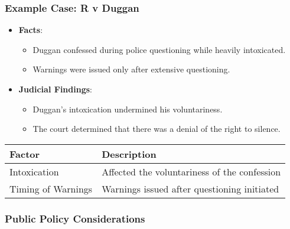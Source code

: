 \subsubsection{Example Case: R v Duggan}\label{example-case-r-v-duggan}

\begin{itemize}
\tightlist
\item
  \textbf{Facts}:

  \begin{itemize}
  \tightlist
  \item
    Duggan confessed during police questioning while heavily
    intoxicated.
  \item
    Warnings were issued only after extensive questioning.
  \end{itemize}
\item
  \textbf{Judicial Findings}:

  \begin{itemize}
  \tightlist
  \item
    Duggan's intoxication undermined his voluntariness.
  \item
    The court determined that there was a denial of the right to
    silence.
  \end{itemize}
\end{itemize}

\begin{longtable}[]{@{}
  >{\raggedright\arraybackslash}p{}
  >{\raggedright\arraybackslash}p{}@{}}
\toprule\noalign{}
\begin{minipage}[b]{\linewidth}\raggedright
Factor
\end{minipage} & \begin{minipage}[b]{\linewidth}\raggedright
Description
\end{minipage} \\
\midrule\noalign{}
\endhead
\bottomrule\noalign{}
\endlastfoot
Intoxication & Affected the voluntariness of the confession \\
Timing of Warnings & Warnings issued after questioning initiated \\
\end{longtable}

\subsubsection{Public Policy
Considerations}\label{public-policy-considerations}

